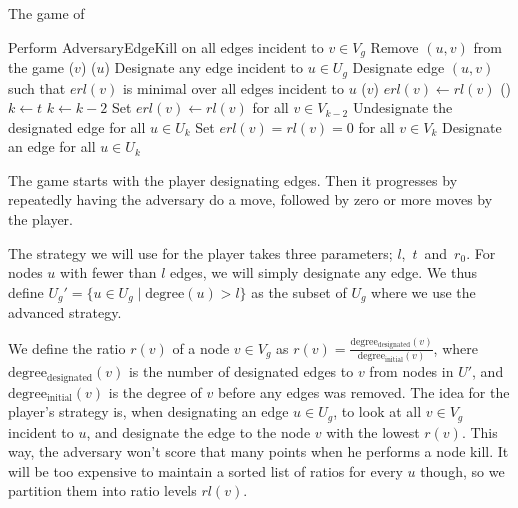 \begin{algorithm}
\caption{The game of \cite{King1992}}\label{King1992Game}
\begin{algorithmic}[1]
	\State Perform {\sc AdversaryEdgeKill} on all edges incident to $v \in V_g$
\EndProcedure
{}
	\State Remove $(u, v)$ from the game
			($v$)
		\EndIf
		($u$)
	\EndIf
\EndProcedure
{}
		\State Designate any edge incident to $u \in U_g$
	\Else
		\State Designate edge $(u, v)$ such that $erl(v)$ is minimal over all edges incident to $u$
		($v$)
	\EndIf
\EndProcedure
{}
		\State $erl(v) \gets rl(v)$
			()
		\EndIf
	\EndIf
\EndProcedure
{}
	\State $k \gets t$
		\State $k \gets k - 2$
	\EndWhile
	\State Set $erl(v) \gets rl(v)$ for all $v \in V_{k-2}$
	\State Undesignate the designated edge for all $u \in U_k$
	\State Set $erl(v)=rl(v)=0$ for all $v \in V_k$
	\State Designate an edge for all $u \in U_k$
\EndProcedure

\end{algorithmic}
\end{algorithm}
The game starts with the player designating edges. Then it progresses by repeatedly having the adversary do a move, followed by zero or more moves by the player.

The strategy we will use for the player takes three parameters; $l$,~$t$~and~$r_0$. 
For nodes $u$ with fewer than $l$ edges, we will simply designate any edge.
We thus define $U_g'=\{u \in U_g \mid \mathrm{degree}(u) > l\}$ as the subset of $U_g$ where we use the advanced strategy.

We define the ratio $r(v)$ of a node $v \in V_g$ as $r(v)=\frac{\mathrm{degree_{designated}}(v)}{\mathrm{degree_{initial}}(v)}$, 
where $\mathrm{degree_{designated}}(v)$ is the number of designated edges to $v$ from nodes in $U'$, and $\mathrm{degree_{initial}}(v)$ is the degree of $v$ before any edges was removed.
The idea for the player's strategy is, when designating an edge $u \in U_g$, to look at all $v \in V_g$ incident to $u$, and designate the edge to the node $v$ with the lowest $r(v)$.
This way, the adversary won't score that many points when he performs a node kill. 
It will be too expensive to maintain a sorted list of ratios for every $u$ though, so we partition them into ratio levels $rl(v)$.

